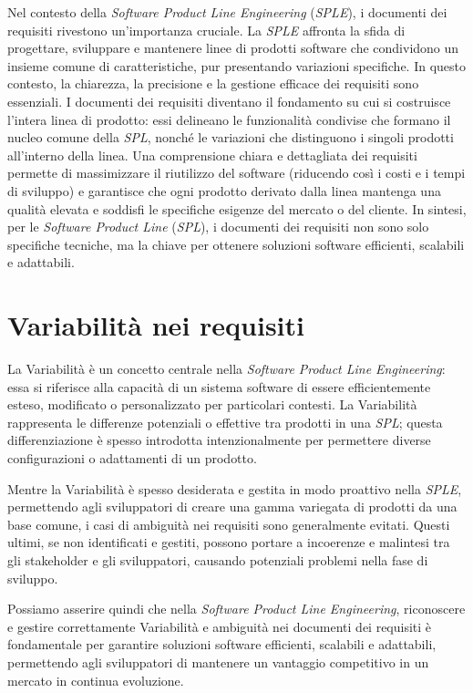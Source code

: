 \documentclass[12pt]{report}
\newcommand{\sple}{\textsl{SPLE}\xspace}
\newcommand{\spl}{\textsl{SPL}\xspace}
\begin{document}
Nel contesto della \textit{Software Product Line Engineering} (\sple), i documenti dei requisiti rivestono un'importanza cruciale. La \sple affronta la sfida di progettare, sviluppare e mantenere linee di prodotti software che condividono un insieme comune di caratteristiche, pur presentando variazioni specifiche. In questo contesto, la chiarezza, la precisione e la gestione efficace dei requisiti sono essenziali. I documenti dei requisiti diventano il fondamento su cui si costruisce l'intera linea di prodotto: essi delineano le funzionalità condivise che formano il nucleo comune della \spl, nonché le variazioni che distinguono i singoli prodotti all'interno della linea. Una comprensione chiara e dettagliata dei requisiti permette di massimizzare il riutilizzo del software (riducendo così i costi e i tempi di sviluppo) e garantisce che ogni prodotto derivato dalla linea mantenga una qualità elevata e soddisfi le specifiche esigenze del mercato o del cliente. In sintesi, per le \textit{Software Product Line} (\spl), i documenti dei requisiti non sono solo specifiche tecniche, ma la chiave per ottenere soluzioni software efficienti, scalabili e adattabili.


\section{Variabilità nei requisiti}
La Variabilità è un concetto centrale nella \textit{Software Product Line Engineering}: essa si riferisce alla capacità di un sistema software di essere efficientemente esteso, modificato o personalizzato per particolari contesti. La Variabilità rappresenta le differenze potenziali o effettive tra prodotti in una \spl; questa differenziazione è spesso introdotta intenzionalmente per permettere diverse configurazioni o adattamenti di un prodotto.

Mentre la Variabilità è spesso desiderata e gestita in modo proattivo nella \sple, permettendo agli sviluppatori di creare una gamma variegata di prodotti da una base comune, i casi di ambiguità nei requisiti sono generalmente evitati. Questi ultimi, se non identificati e gestiti, possono portare a incoerenze e malintesi tra gli stakeholder e gli sviluppatori, causando potenziali problemi nella fase di sviluppo.

Possiamo asserire quindi che nella \textit{Software Product Line Engineering}, riconoscere e gestire correttamente Variabilità e ambiguità nei documenti dei requisiti è fondamentale per garantire soluzioni software efficienti, scalabili e adattabili, permettendo agli sviluppatori di mantenere un vantaggio competitivo in un mercato in continua evoluzione.
\end{document}
